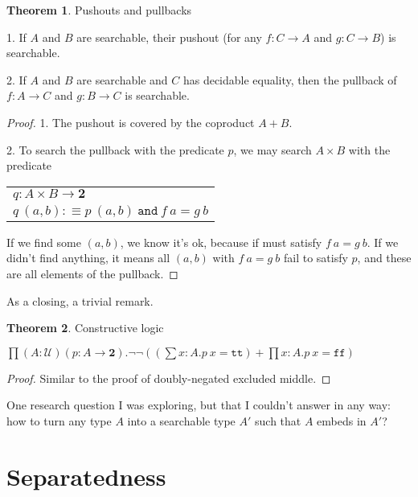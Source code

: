\documentclass[11pt]{article}
\theoremstyle{definition}
\newtheorem{theorem}{Theorem}[section]
\newcommand{\txt}[1]{\texttt{#1}}
\renewcommand{\(}{\left(}
\renewcommand{\)}{\right)}
\newcommand{\defn}{:\equiv}
\newcommand{\U}{\mathcal{U}}
\newcommand{\apl}[2]{#1\ #2}
\newcommand{\Bool}{\mathbf{2}}
\newcommand{\true}{\txt{tt}}
\newcommand{\false}{\txt{ff}}
\newcommand{\dprod}[2]{\prod #1.#2}
\newcommand{\dsum}[2]{\sum #1.#2}
\newcommand{\prodt}[2]{#1 \times #2}
\begin{document}
\begin{theorem} Pushouts and pullbacks

1. If $A$ and $B$ are searchable, their pushout (for any $f : C \to A$ and $g : C \to B$) is searchable.

2. If $A$ and $B$ are searchable and $C$ has decidable equality, then the pullback of $f: A \to C$ and $g : B \to C$ is searchable.
\end{theorem}
\begin{proof}

1. The pushout is covered by the coproduct $A + B$.

2. To search the pullback with the predicate $p$, we may search $\prodt{A}{B}$ with the predicate

\begin{center}
\begin{tabular}{l}
$q : \prodt{A}{B} \to \Bool$ \\
$\apl{q}{(a, b)} \defn \apl{p}{(a, b)}\ \txt{and}\ \apl{f}{a} = \apl{g}{b}$
\end{tabular}
\end{center}

If we find some $(a, b)$, we know it's ok, because if must satisfy $\apl{f}{a} = \apl{g}{b}$. If we didn't find anything, it means all $(a, b)$ with $\apl{f}{a} = \apl{g}{b}$ fail to satisfy $p$, and these are all elements of the pullback.

\end{proof}

As a closing, a trivial remark.

\begin{theorem} Constructive logic

$\dprod{(A : \U)(p : A \to \Bool)}{\neg\neg \(\(\dsum{x : A}{\apl{p}{x} = \true}\) + \dprod{x : A}{\apl{p}{x} = \false}\)}$

\end{theorem}
\begin{proof}
Similar to the proof of doubly-negated excluded middle.
\end{proof}

One research question I was exploring, but that I couldn't answer in any way: how to turn any type $A$ into a searchable type $A'$ such that $A$ embeds in $A'$?

\section{Separatedness}
\end{document}
